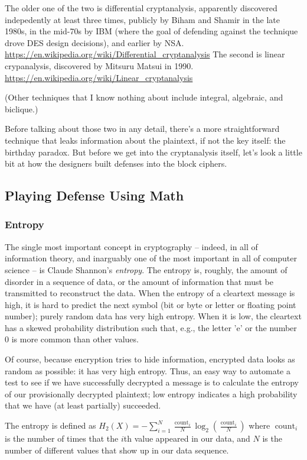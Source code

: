\documentclass[%
 aip,
 jmp,%
 amsmath,amssymb,
 reprint,%
]{revtex4-1}
\begin{document}
The older one of the two is differential cryptanalysis, apparently
discovered indepedently at least three times, publicly by Biham and
Shamir in the late 1980s, in the mid-70s by IBM (where the goal of
defending against the technique drove DES design decisions), and
earlier by NSA.
\url{https://en.wikipedia.org/wiki/Differential_cryptanalysis}
The second is linear crypanalysis, discovered by Mitsuru Matsui in
1990.
\url{https://en.wikipedia.org/wiki/Linear_cryptanalysis}

(Other techniques that I know nothing about include integral,
algebraic, and biclique.)

Before talking about those two in any detail, there's a more
straightforward technique that leaks information about the plaintext,
if not the key itself: the birthday paradox.  But before we get into
the cryptanalysis itself, let's look a little bit at how the designers
built defenses into the block ciphers.

\subsection{Playing Defense Using Math}

\subsubsection{Entropy}

The single most important concept in cryptography -- indeed, in all of
information theory, and inarguably one of the most important in all of
computer science -- is Claude Shannon's \emph{entropy}.  The entropy is,
roughly, the amount of disorder in a sequence of data, or the amount
of information that must be transmitted to reconstruct the data.  When
the entropy of a cleartext message is high, it is hard to predict the
next symbol (bit or byte or letter or floating point number); purely
random data has very high entropy.  When it is low, the cleartext has
a skewed probability distribution such that, e.g., the letter 'e' or
the number 0 is more common than other values.

Of course, because encryption tries to hide information, encrypted
data looks as random as possible: it has very high entropy.  Thus, an
easy way to automate a test to see if we have successfully decrypted a
message is to calculate the entropy of our provisionally decrypted
plaintext; low entropy indicates a high probability that we have (at
least partially) succeeded.

The entropy is defined as
$H_{2}(X)=-\sum_{i=1}^{N} \frac{\operatorname{count}_{i}}{N} \log
_{2}\left(\frac{\operatorname{count}_{i}}{N}\right)$
where $\operatorname{count}_i$ is the number of times that the $i$th
value appeared in our data, and $N$ is the number of different values
that show up in our data sequence.
\end{document}
